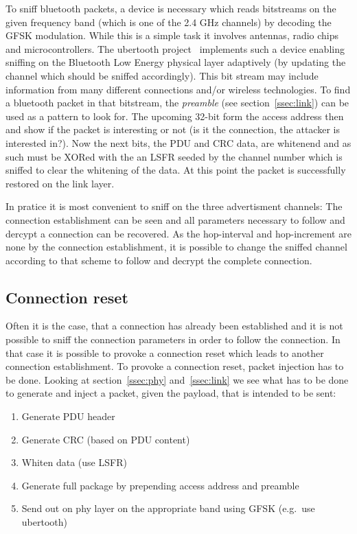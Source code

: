 \documentclass[conference]{IEEEtran}
\begin{document}
To sniff bluetooth packets, a device is necessary which reads bitstreams on the given frequency band (which is one of the 2.4 GHz channels) by decoding the GFSK modulation. While this is a simple task it involves antennas, radio chips and microcontrollers. The ubertooth project~\cite{ubertooth} implements such a device enabling sniffing on the Bluetooth Low Energy physical layer adaptively (by updating the channel which should be sniffed accordingly). This bit stream may include information from many different connections and/or wireless technologies. To find a bluetooth packet in that bitstream, the \emph{preamble} (see section~\ref{ssec:link}) can be used as a pattern to look for. The upcoming 32-bit form the access address then and show if the packet is interesting or not (is it the connection, the attacker is interested in?). Now the next bits, the PDU and CRC data, are whitenend and as such must be XORed with the an LSFR seeded by the channel number which is sniffed to clear the whitening of the data. At this point the packet is successfully restored on the link layer.

In pratice it is most convenient to sniff on the three advertisment channels: The connection establishment can be seen and all parameters necessary to follow and dercypt a connection can be recovered. As the hop-interval and hop-increment are none by the connection establishment, it is possible to change the sniffed channel according to that scheme to follow and decrypt the complete connection.

\subsection{Connection reset} \label{ssec:conreset}

Often it is the case, that a connection has already been established and it is not possible to sniff the connection parameters in order to follow the connection. In that case it is possible to provoke a connection reset which leads to another connection establishment.
To provoke a connection reset, packet injection has to be done. Looking at section~\ref{ssec:phy} and~\ref{ssec:link} we see what has to be done to generate and inject a packet, given the payload, that is intended to be sent:

\begin{enumerate}
  \item Generate PDU header
  \item Generate CRC (based on PDU content)
  \item Whiten data (use LSFR)
  \item Generate full package by prepending access address and preamble
  \item Send out on phy layer on the appropriate band using GFSK (e.g.\ use ubertooth)
\end{enumerate}
\end{document}
